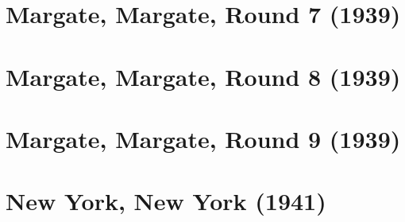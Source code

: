 \documentclass[11pt]{article}
\begin{document}
\clearpage

\section{Margate, Margate, Round 7 (1939)}


\clearpage

\section{Margate, Margate, Round 8 (1939)}


\clearpage

\section{Margate, Margate, Round 9 (1939)}


\clearpage

\section{New York, New York (1941)}


\clearpage



\clearpage



\clearpage
\end{document}
